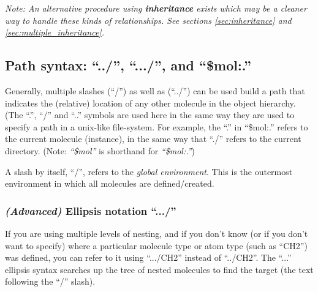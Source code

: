 \documentclass[11pt]{article}
\begin{document}


\textit{Note: An alternative procedure using \textbf{inheritance}
exists which may be a cleaner way to handle these kinds of relationships.
See sections \ref{sec:inheritance} and \ref{sec:multiple_inheritance}.}

\subsection{Path syntax: ``../'', ``.../'', and ``\$mol:.''}
\label{sec:paths}
Generally, multiple slashes (``/'') as well as (``../'') can be
used build a path that indicates the (relative) location 
of any other molecule in the object hierarchy. 
(The ``.'', ``/'' and ``..'' symbols are used here in the same way 
they are used to specify a path in a unix-like file-system.
For example, the ``.'' in ``\$mol:.'' refers to the 
current molecule (instance), in the same way that 
``./'' refers to the current directory.
(Note: \mbox{\textit{``\$mol''}} is shorthand for \mbox{\textit{``\$mol:.''}})

A slash by itself, ``/'', refers to the \textit{global environment}.
This is the outermost environment in which all molecules are defined/created.

\subsubsection*{\textit{(Advanced)} Ellipsis notation ``.../''}
If you are using multiple levels of nesting,
and if you don't know (or if you don't want to specify) where
a particular molecule type or atom type (such as ``CH2'') was defined, 
you can refer to it using ``.../CH2'' 
instead of ``../CH2''.
The ``...'' ellipsis syntax searches up the tree of nested 
molecules to find the target (the text following the ``/'' slash).

\end{document}
